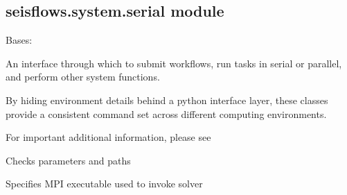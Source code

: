 \documentclass[letterpaper,10pt,english]{sphinxmanual}
\begin{document}
\subsection{seisflows.system.serial module}
\label{\detokenize{ref/seisflows.system:module-seisflows.system.serial}}\label{\detokenize{ref/seisflows.system:seisflows-system-serial-module}}

\begin{fulllineitems}
\label{\detokenize{ref/seisflows.system:seisflows.system.serial.serial}}
Bases: {\hyperref[\detokenize{ref/seisflows.system:seisflows.system.base.base}]{}}

An interface through which to submit workflows, run tasks in serial or
parallel, and perform other system functions.

By hiding environment details behind a python interface layer, these
classes provide a consistent command set across different computing
environments.

For important additional information, please see

\begin{fulllineitems}
\label{\detokenize{ref/seisflows.system:seisflows.system.serial.serial.check}}
Checks parameters and paths

\end{fulllineitems}


\begin{fulllineitems}
\label{\detokenize{ref/seisflows.system:seisflows.system.serial.serial.mpiexec}}
Specifies MPI executable used to invoke solver


\end{fulllineitems}
\end{fulllineitems}
\end{document}
